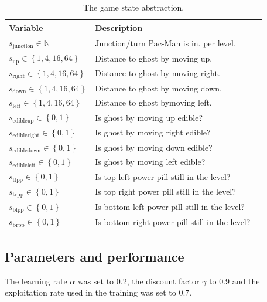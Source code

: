\documentclass[conference]{IEEEtran}
\begin{document}
\begin{table}
\begin{center}
\caption{The game state abstraction. }
\label{abgamestate}
\begin{tabular}{|l|l|l|}
\hline
Variable & Description \\
\hline
$s_{\mathrm{junction}} \in \mathbb{N}$ & Junction/turn Pac-Man is in. \texttildelow 64 per level.\\
\hline
$s_{\mathrm{up}} \in \left\lbrace 1,4,16,64 \right\rbrace$ & Distance to ghost by moving up. \\
\hline
$s_{\mathrm{right}} \in \left\lbrace 1,4,16,64 \right\rbrace$ & Distance to ghost by moving right. \\
\hline
$s_{\mathrm{down}} \in \left\lbrace 1,4,16,64 \right\rbrace$ & Distance to ghost by moving down. \\
\hline
$s_{\mathrm{left}} \in \left\lbrace 1,4,16,64 \right\rbrace$ & Distance to ghost bymoving left. \\
\hline
$s_{\mathrm{edibleup}} \in \left\lbrace 0,1 \right\rbrace$ & Is ghost by moving up edible? \\
\hline
$s_{\mathrm{edibleright}} \in \left\lbrace 0,1 \right\rbrace$ & Is ghost by moving right edible? \\
\hline
$s_{\mathrm{edibledown}} \in \left\lbrace 0,1 \right\rbrace$ & Is ghost by moving down edible? \\
\hline
$s_{\mathrm{edibleleft}} \in \left\lbrace 0,1 \right\rbrace$ & Is ghost by moving left edible? \\
\hline
$s_{\mathrm{tlpp}} \in \left\lbrace 0,1 \right\rbrace$ & Is top left power pill still in the level? \\
\hline
$s_{\mathrm{trpp}} \in \left\lbrace 0,1 \right\rbrace$ & Is top right power pill still in the level? \\
\hline
$s_{\mathrm{blpp}} \in \left\lbrace 0,1 \right\rbrace$ & Is bottom left power pill still in the level? \\
\hline
$s_{\mathrm{brpp}} \in \left\lbrace 0,1 \right\rbrace$ & Is bottom right power pill still in the level? \\
\hline
\end{tabular}
\end{center}
\end{table}

\subsection{Parameters and performance}
The learning rate $\alpha$ was set to 0.2, the discount factor $\gamma$ to 0.9 and the exploitation rate used in the training was set to 0.7.
\end{document}
